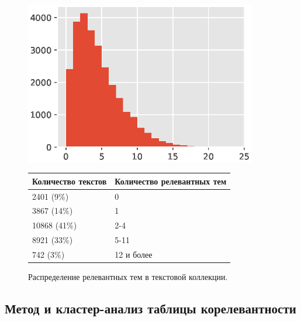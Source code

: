 \documentclass[12pt]{article}
\let\oldsubsection\subsection
\renewcommand{\subsection}{\clearpage\oldsubsection}
\begin{document}
\begin{figure}
	\centering
	\caption{Распределение релевантных тем в текстовой коллекции.}
	\label{fig:relevant_counts}
	\begin{minipage}{0.45\textwidth}
		\centering
		\includegraphics[width=0.9\textwidth]{images/relevants_hist}
	\end{minipage}
	\begin{minipage}{0.45\textwidth}
		\centering
		\begin{tabular}{|p{}|p{}|}
			\hline 
			Количество текстов & Количество релевантных тем \\ 
			\hline 
			2401 (9\%)  & 0 \\ 
			3867 (14\%)   & 1 \\ 
			10868 (41\%)  & 2-4 \\ 
			8921 (33\%)   & 5-11 \\ 
			742 (3\%)    & 12 и более \\ 
			\hline 
		\end{tabular} 
	\end{minipage}
\end{figure}

\subsection{Метод и кластер-анализ таблицы корелевантности}
\end{document}

